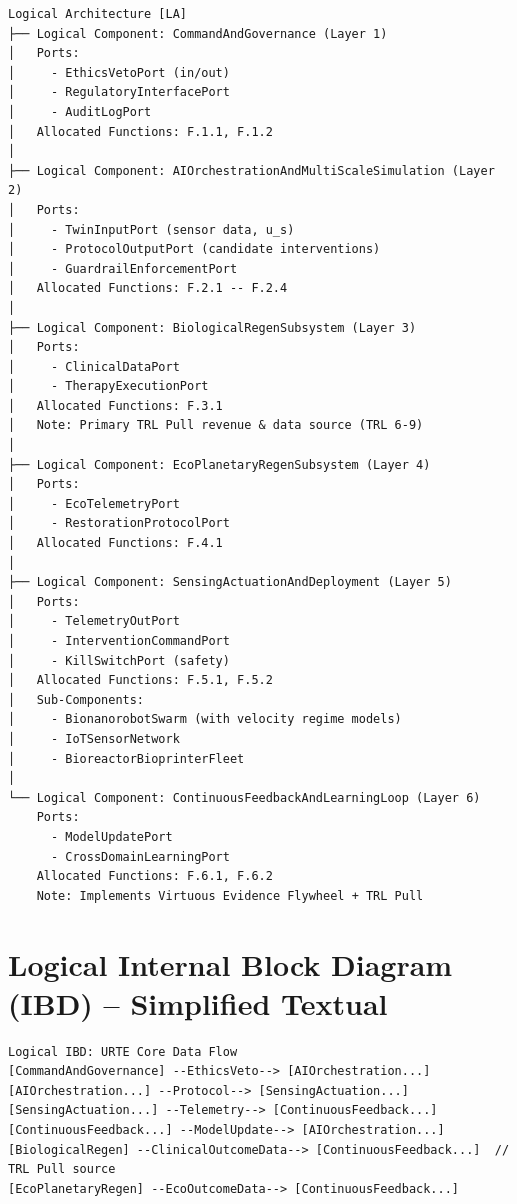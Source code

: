 \documentclass[11pt,a4paper]{report}
\begin{document}
\begin{lstlisting}[style=sysmlstyle, caption={Logical Architecture (LA) -- URTE Layers as Logical Components}]
Logical Architecture [LA]
├── Logical Component: CommandAndGovernance (Layer 1)
│   Ports:
│     - EthicsVetoPort (in/out)
│     - RegulatoryInterfacePort
│     - AuditLogPort
│   Allocated Functions: F.1.1, F.1.2
│
├── Logical Component: AIOrchestrationAndMultiScaleSimulation (Layer 2)
│   Ports:
│     - TwinInputPort (sensor data, u_s)
│     - ProtocolOutputPort (candidate interventions)
│     - GuardrailEnforcementPort
│   Allocated Functions: F.2.1 -- F.2.4
│
├── Logical Component: BiologicalRegenSubsystem (Layer 3)
│   Ports:
│     - ClinicalDataPort
│     - TherapyExecutionPort
│   Allocated Functions: F.3.1
│   Note: Primary TRL Pull revenue & data source (TRL 6-9)
│
├── Logical Component: EcoPlanetaryRegenSubsystem (Layer 4)
│   Ports:
│     - EcoTelemetryPort
│     - RestorationProtocolPort
│   Allocated Functions: F.4.1
│
├── Logical Component: SensingActuationAndDeployment (Layer 5)
│   Ports:
│     - TelemetryOutPort
│     - InterventionCommandPort
│     - KillSwitchPort (safety)
│   Allocated Functions: F.5.1, F.5.2
│   Sub-Components:
│     - BionanorobotSwarm (with velocity regime models)
│     - IoTSensorNetwork
│     - BioreactorBioprinterFleet
│
└── Logical Component: ContinuousFeedbackAndLearningLoop (Layer 6)
    Ports:
      - ModelUpdatePort
      - CrossDomainLearningPort
    Allocated Functions: F.6.1, F.6.2
    Note: Implements Virtuous Evidence Flywheel + TRL Pull
\end{lstlisting}

\section{Logical Internal Block Diagram (IBD) -- Simplified Textual}

\begin{lstlisting}[style=sysmlstyle, caption={Logical IBD: Cross-Layer Data Flow (Arcadia Style)}]
Logical IBD: URTE Core Data Flow
[CommandAndGovernance] --EthicsVeto--> [AIOrchestration...]
[AIOrchestration...] --Protocol--> [SensingActuation...]
[SensingActuation...] --Telemetry--> [ContinuousFeedback...]
[ContinuousFeedback...] --ModelUpdate--> [AIOrchestration...]
[BiologicalRegen] --ClinicalOutcomeData--> [ContinuousFeedback...]  // TRL Pull source
[EcoPlanetaryRegen] --EcoOutcomeData--> [ContinuousFeedback...]
\end{lstlisting}

\end{document}
